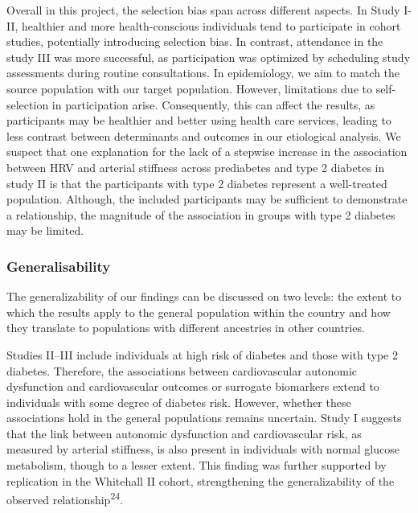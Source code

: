 \documentclass[
  a4paper,
  headsepline=true,
  open=any]{scrbook}
\begin{document}
Overall in this project, the selection bias span across different
aspects. In Study I-II, healthier and more health-conscious individuals
tend to participate in cohort studies, potentially introducing selection
bias. In contrast, attendance in the study III was more successful, as
participation was optimized by scheduling study assessments during
routine consultations. In epidemiology, we aim to match the source
population with our target population. However, limitations due to
self-selection in participation arise. Consequently, this can affect the
results, as participants may be healthier and better using health care
services, leading to less contrast between determinants and outcomes in
our etiological analysis. We suspect that one explanation for the lack
of a stepwise increase in the association between HRV and arterial
stiffness across prediabetes and type 2 diabetes in study II is that the
participants with type 2 diabetes represent a well-treated population.
Although, the included participants may be sufficient to demonstrate a
relationship, the magnitude of the association in groups with type 2
diabetes may be limited.

\hypertarget{generalisability}{%
\subsubsection{Generalisability}\label{generalisability}}

The generalizability of our findings can be discussed on two levels: the
extent to which the results apply to the general population within the
country and how they translate to populations with different ancestries
in other countries.

Studies II--III include individuals at high risk of diabetes and those
with type 2 diabetes. Therefore, the associations between cardiovascular
autonomic dysfunction and cardiovascular outcomes or surrogate
biomarkers extend to individuals with some degree of diabetes risk.
However, whether these associations hold in the general populations
remains uncertain. Study I suggests that the link between autonomic
dysfunction and cardiovascular risk, as measured by arterial stiffness,
is also present in individuals with normal glucose metabolism, though to
a lesser extent. This finding was further supported by replication in
the Whitehall II cohort, strengthening the generalizability of the
observed relationship\textsuperscript{24}.
\end{document}
